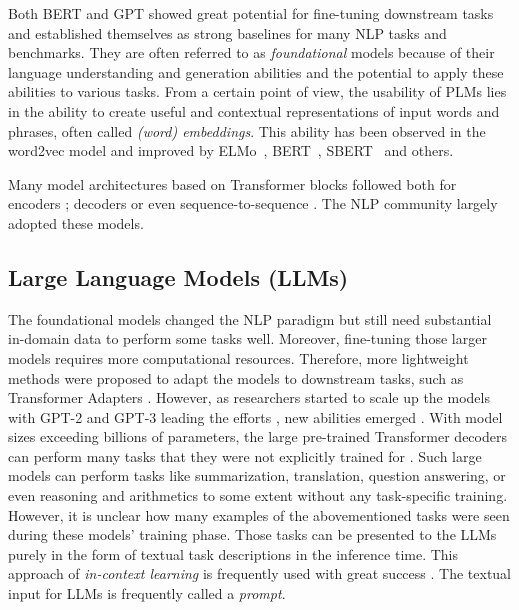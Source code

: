 Both BERT and GPT showed great potential for fine-tuning downstream tasks and established themselves as strong baselines for many NLP tasks and benchmarks.
They are often referred to as \emph{foundational} models because of their language understanding and generation abilities and the potential to apply these abilities to various tasks.
From a certain point of view, the usability of PLMs lies in the ability to create useful and contextual representations of input words and phrases, often called \emph{(word) embeddings}.
This ability has been observed in the word2vec model \cite{mikolov2013distributed} and improved by ELMo~\cite{peters-etal-2018-deep}, BERT~\cite{devlin2019}, SBERT~\cite{reimers2019sentence} and others.

Many model architectures based on Transformer blocks followed both for encoders \cite{liu2019roberta,reimers2019sentence}; decoders \cite{radford2019language,brown2020language} or even sequence-to-sequence \cite{raffel2020exploring,lewis-etal-2020-bart}.
The NLP community largely adopted these models.


\subsection{Large Language Models (LLMs)}
The foundational models changed the NLP paradigm but still need substantial in-domain data to perform some tasks well.
Moreover, fine-tuning those larger models requires more computational resources.
Therefore, more lightweight methods were proposed to adapt the models to downstream tasks, such as Transformer Adapters \cite{pfeiffer2020AdapterHub}.
However, as researchers started to scale up the models with GPT-2 and GPT-3 leading the efforts \cite{radford2019language,brown2020language}, new abilities emerged \cite{wei2022emergent}.
With model sizes exceeding billions of parameters, the large pre-trained Transformer decoders can perform many tasks that they were not explicitly trained for \cite{brown2020language}.
Such large models can perform tasks like summarization, translation, question answering, or even reasoning and arithmetics to some extent without any task-specific training.
However, it is unclear how many examples of the abovementioned tasks were seen during these models' training phase.
Those tasks can be presented to the LLMs purely in the form of textual task descriptions in the inference time.
This approach of \emph{in-context learning} is frequently used with great success \cite{min2022rethinking,dong2022survey}.
The textual input for LLMs is frequently called a \emph{prompt}.

